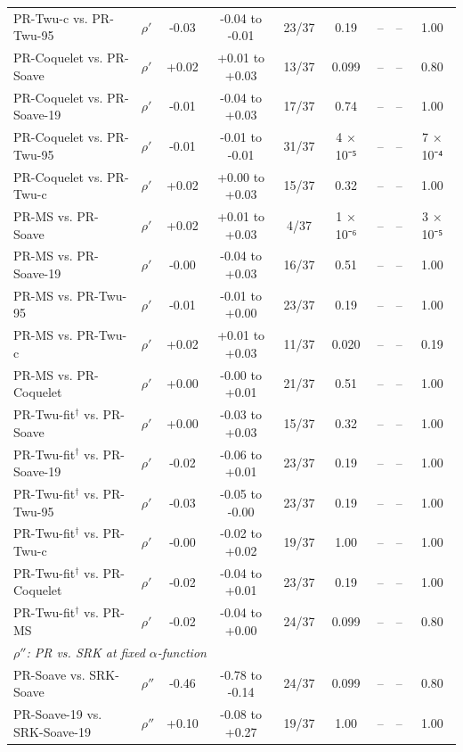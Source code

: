 \begin{table}[H]
\begin{tabular}{llccccccc}
PR-Twu-c vs. PR-Twu-95 & $\rho'$ & -0.03 & -0.04 to -0.01 & 23/37 & 0.19 & -- & -- & 1.00 \\
PR-Coquelet vs. PR-Soave & $\rho'$ & +0.02 & +0.01 to +0.03 & 13/37 & 0.099 & -- & -- & 0.80 \\
PR-Coquelet vs. PR-Soave-19 & $\rho'$ & -0.01 & -0.04 to +0.03 & 17/37 & 0.74 & -- & -- & 1.00 \\
PR-Coquelet vs. PR-Twu-95 & $\rho'$ & -0.01 & -0.01 to -0.01 & 31/37 & 4 × 10⁻⁵ & -- & -- & 7 × 10⁻⁴ \\
PR-Coquelet vs. PR-Twu-c & $\rho'$ & +0.02 & +0.00 to +0.03 & 15/37 & 0.32 & -- & -- & 1.00 \\
PR-MS vs. PR-Soave & $\rho'$ & +0.02 & +0.01 to +0.03 & 4/37 & 1 × 10⁻⁶ & -- & -- & 3 × 10⁻⁵ \\
PR-MS vs. PR-Soave-19 & $\rho'$ & -0.00 & -0.04 to +0.03 & 16/37 & 0.51 & -- & -- & 1.00 \\
PR-MS vs. PR-Twu-95 & $\rho'$ & -0.01 & -0.01 to +0.00 & 23/37 & 0.19 & -- & -- & 1.00 \\
PR-MS vs. PR-Twu-c & $\rho'$ & +0.02 & +0.01 to +0.03 & 11/37 & 0.020 & -- & -- & 0.19 \\
PR-MS vs. PR-Coquelet & $\rho'$ & +0.00 & -0.00 to +0.01 & 21/37 & 0.51 & -- & -- & 1.00 \\
PR-Twu-fit$^{\dagger}$ vs. PR-Soave & $\rho'$ & +0.00 & -0.03 to +0.03 & 15/37 & 0.32 & -- & -- & 1.00 \\
PR-Twu-fit$^{\dagger}$ vs. PR-Soave-19 & $\rho'$ & -0.02 & -0.06 to +0.01 & 23/37 & 0.19 & -- & -- & 1.00 \\
PR-Twu-fit$^{\dagger}$ vs. PR-Twu-95 & $\rho'$ & -0.03 & -0.05 to -0.00 & 23/37 & 0.19 & -- & -- & 1.00 \\
PR-Twu-fit$^{\dagger}$ vs. PR-Twu-c & $\rho'$ & -0.00 & -0.02 to +0.02 & 19/37 & 1.00 & -- & -- & 1.00 \\
PR-Twu-fit$^{\dagger}$ vs. PR-Coquelet & $\rho'$ & -0.02 & -0.04 to +0.01 & 23/37 & 0.19 & -- & -- & 1.00 \\
PR-Twu-fit$^{\dagger}$ vs. PR-MS & $\rho'$ & -0.02 & -0.04 to +0.00 & 24/37 & 0.099 & -- & -- & 0.80 \\
\multicolumn{9}{l}{\emph{$\rho''$: PR vs. SRK at fixed $\alpha$-function}} \\
PR-Soave vs. SRK-Soave & $\rho''$ & -0.46 & -0.78 to -0.14 & 24/37 & 0.099 & -- & -- & 0.80 \\
PR-Soave-19 vs. SRK-Soave-19 & $\rho''$ & +0.10 & -0.08 to +0.27 & 19/37 & 1.00 & -- & -- & 1.00 \\

\end{tabular}
\end{table}
